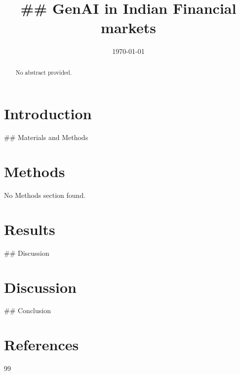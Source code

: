 \documentclass[11pt]{article}
\title{## GenAI in Indian Financial markets}
\author{}
\date{\today}
\begin{document}
\maketitle

\begin{abstract}
No abstract provided.
\end{abstract}

\section*{Introduction}
## Materials and Methods

\section*{Methods}
No Methods section found.

\section*{Results}
## Discussion

\section*{Discussion}
## Conclusion

\section*{References}
\begin{thebibliography}{99}

\end{thebibliography}
\end{document}
